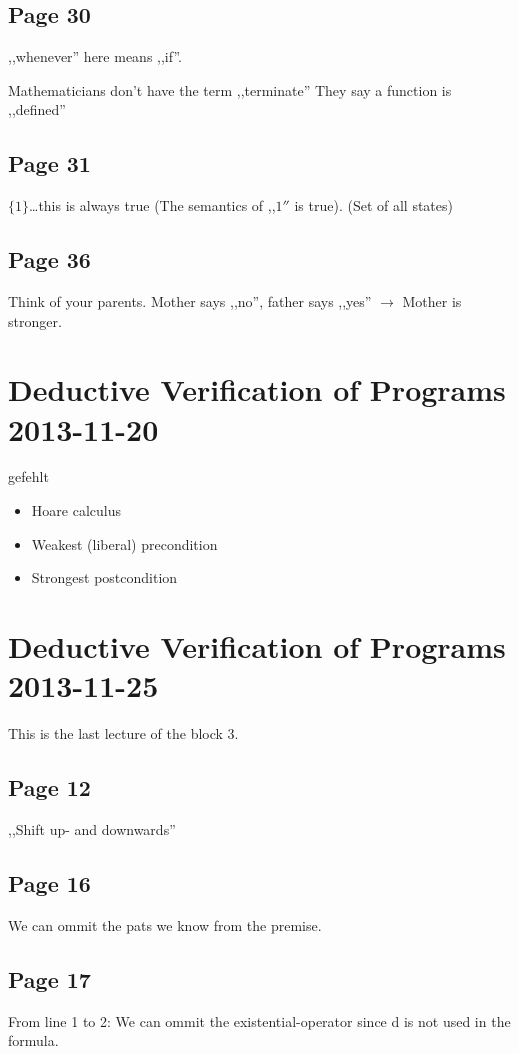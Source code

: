 \documentclass[a4paper]{article}
\begin{document}
\subsection{Page 30}
,,whenever'' here means ,,if''.

Mathematicians don't have the term ,,terminate'' They say  a function is
,,defined''

\subsection{Page 31}
$\{1\}$\ldots this is always true (The semantics of ,,$1''$ is true). (Set of
all states)

\subsection{Page 36}
Think of your parents. Mother says ,,no'', father says ,,yes'' $\rightarrow$
Mother is stronger.


\section{Deductive Verification of Programs 2013-11-20}
gefehlt
\begin{itemize}
	\item Hoare calculus
	\item Weakest (liberal) precondition
	\item Strongest postcondition
\end{itemize}

\section{Deductive Verification of Programs 2013-11-25}
This is the last lecture of the block 3.


\subsection{Page 12}
,,Shift up- and downwards''

\subsection{Page 16}
We can ommit the pats we know from the premise.

\subsection{Page 17}
From line 1 to 2: We can ommit the existential-operator since d is not used in
the formula.
\end{document}
